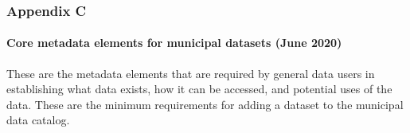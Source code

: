 \documentclass[
]{WileySix}
\begin{document}
\hypertarget{appendix-c-1}{%
\subsubsection*{Appendix C}\label{appendix-c-1}}

\hypertarget{core-metadata-elements-for-municipal-datasets-june-2020}{%
\paragraph{Core metadata elements for municipal datasets (June 2020)}\label{core-metadata-elements-for-municipal-datasets-june-2020}}

These are the metadata elements that are required by general data users in establishing what data exists, how it can be accessed, and potential uses of the data. These are the minimum requirements for adding a dataset to the municipal data catalog.
\end{document}
